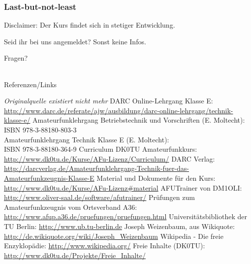\begin{frame}
    \frametitle{Last-but-not-least}

    Disclaimer: Der Kurs findet sich in stetiger Entwicklung.

    \bigskip
    \pause

    Seid ihr bei uns angemeldet? Sonst keine Infos.

    \bigskip
    \pause

    Fragen?

\end{frame}

\renewcommand{\refname}{Referenzen}

\hypertarget{refs}{}
\textcolor{white}{} \\ %
\Large Referenzen/Links
\footnotesize

\begin{thebibliography}{}
      \emph{Originalquelle existiert nicht mehr}
      DARC Online-Lehrgang Klasse E:
                    \url{http://www.darc.de/referate/ajw/ausbildung/darc-online-lehrgang/technik-klasse-e/}
     Amateurfunklehrgang Betriebstechnik und Vorschriften (E. Moltecht): \\
                    ISBN 978-3-88180-803-3 \\
                    Amateurfunklehrgang Technik Klasse E (E. Moltecht): \\
                    ISBN 978-3-88180-364-9
      Curriculum DK0TU Amateurfunkkurs: \\
                    \url{http://www.dk0tu.de/Kurse/AFu-Lizenz/Curriculum/}
     DARC Verlag:
                    \url{http://darcverlag.de/Amateurfunklehrgang-Technik-fuer-das-Amateurfunkzeugnis-Klasse-E}
       Material und Dokumente für den Kurs:
                    \url{http://www.dk0tu.de/Kurse/AFu-Lizenz#material}
      AFUTrainer von DM1OLI:
                    \url{http://www.oliver-saal.de/software/afutrainer/}
      Prüfungen zum Amateurfunkzeugnis vom Ortsverband A36:
                    \url{http://www.afup.a36.de/pruefungen/pruefungen.html}
        Universitätsbibliothek der TU Berlin:
                    \url{http://www.ub.tu-berlin.de}
     Joseph Weizenbaum, aus Wikiquote:
                    \url{http://de.wikiquote.org/wiki/Joseph_Weizenbaum}
        Wikipedia - Die freie Enzyklopädie:
                    \url{http://www.wikipedia.org/}
        Freie Inhalte (DK0TU):
                    \url{http://www.dk0tu.de/Projekte/Freie_Inhalte/}
\end{thebibliography} 


